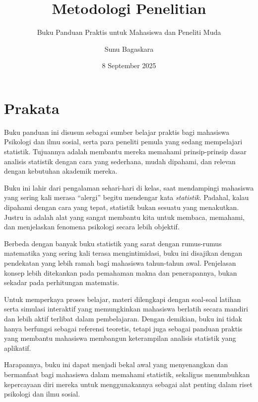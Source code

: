 \documentclass[
  indonesian,
  letterpaper,
  DIV=11,
  numbers=noendperiod]{scrreprt}
\title{Metodologi Penelitian}
\subtitle{Buku Panduan Praktis untuk Mahasiswa dan Peneliti Muda}
\author{Sunu Bagaskara}
\date{8 September 2025}
\renewcommand*\contentsname{Daftar Isi}
\newcommand\contentsname{Daftar Isi}
\begin{document}
\maketitle

\renewcommand*\contentsname{Daftar Isi}
{
\hypersetup{linkcolor=}
\setcounter{tocdepth}{2}
\tableofcontents
}


\chapter*{Prakata}\label{prakata}


Buku panduan ini disusun sebagai sumber belajar praktis bagi mahasiswa
Psikologi dan ilmu sosial, serta para peneliti pemula yang sedang
mempelajari statistik. Tujuannya adalah membantu mereka memahami
prinsip-prinsip dasar analisis statistik dengan cara yang sederhana,
mudah dipahami, dan relevan dengan kebutuhan akademik mereka.

Buku ini lahir dari pengalaman sehari-hari di kelas, saat mendampingi
mahasiswa yang sering kali merasa ``alergi'' begitu mendengar kata
\emph{statistik}. Padahal, kalau dipahami dengan cara yang tepat,
statistik bukan sesuatu yang menakutkan. Justru ia adalah alat yang
sangat membantu kita untuk membaca, memahami, dan menjelaskan fenomena
psikologi secara lebih objektif.

Berbeda dengan banyak buku statistik yang sarat dengan rumus-rumus
matematika yang sering kali terasa mengintimidasi, buku ini disajikan
dengan pendekatan yang lebih ramah bagi mahasiswa tahun-tahun awal.
Penjelasan konsep lebih ditekankan pada pemahaman makna dan
penerapannya, bukan sekadar pada perhitungan matematis.

Untuk memperkaya proses belajar, materi dilengkapi dengan soal-soal
latihan serta simulasi interaktif yang memungkinkan mahasiswa berlatih
secara mandiri dan lebih aktif terlibat dalam pembelajaran. Dengan
demikian, buku ini tidak hanya berfungsi sebagai referensi teoretis,
tetapi juga sebagai panduan praktis yang membantu mahasiswa membangun
keterampilan analisis statistik yang aplikatif.

Harapannya, buku ini dapat menjadi bekal awal yang menyenangkan dan
bermanfaat bagi mahasiswa dalam memahami statistik, sekaligus
menumbuhkan kepercayaan diri mereka untuk menggunakannya sebagai alat
penting dalam riset psikologi dan ilmu sosial.
\end{document}
